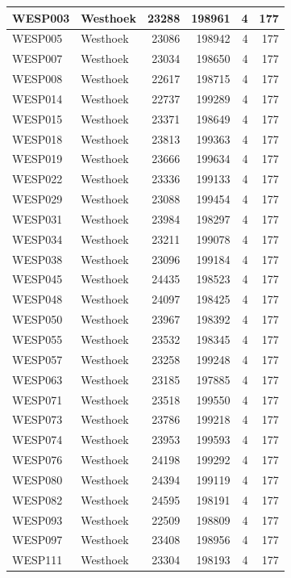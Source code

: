 \documentclass[11pt,]{book}
\begin{document}
\begin{table}
\begin{tabular}[t]{l|l|r|r|r|r}
\hline
WESP003 & Westhoek & 23288 & 198961 & 4 & 177\\
\hline
WESP005 & Westhoek & 23086 & 198942 & 4 & 177\\
\hline
WESP007 & Westhoek & 23034 & 198650 & 4 & 177\\
\hline
WESP008 & Westhoek & 22617 & 198715 & 4 & 177\\
\hline
WESP014 & Westhoek & 22737 & 199289 & 4 & 177\\
\hline
WESP015 & Westhoek & 23371 & 198649 & 4 & 177\\
\hline
WESP018 & Westhoek & 23813 & 199363 & 4 & 177\\
\hline
WESP019 & Westhoek & 23666 & 199634 & 4 & 177\\
\hline
WESP022 & Westhoek & 23336 & 199133 & 4 & 177\\
\hline
WESP029 & Westhoek & 23088 & 199454 & 4 & 177\\
\hline
WESP031 & Westhoek & 23984 & 198297 & 4 & 177\\
\hline
WESP034 & Westhoek & 23211 & 199078 & 4 & 177\\
\hline
WESP038 & Westhoek & 23096 & 199184 & 4 & 177\\
\hline
WESP045 & Westhoek & 24435 & 198523 & 4 & 177\\
\hline
WESP048 & Westhoek & 24097 & 198425 & 4 & 177\\
\hline
WESP050 & Westhoek & 23967 & 198392 & 4 & 177\\
\hline
WESP055 & Westhoek & 23532 & 198345 & 4 & 177\\
\hline
WESP057 & Westhoek & 23258 & 199248 & 4 & 177\\
\hline
WESP063 & Westhoek & 23185 & 197885 & 4 & 177\\
\hline
WESP071 & Westhoek & 23518 & 199550 & 4 & 177\\
\hline
WESP073 & Westhoek & 23786 & 199218 & 4 & 177\\
\hline
WESP074 & Westhoek & 23953 & 199593 & 4 & 177\\
\hline
WESP076 & Westhoek & 24198 & 199292 & 4 & 177\\
\hline
WESP080 & Westhoek & 24394 & 199119 & 4 & 177\\
\hline
WESP082 & Westhoek & 24595 & 198191 & 4 & 177\\
\hline
WESP093 & Westhoek & 22509 & 198809 & 4 & 177\\
\hline
WESP097 & Westhoek & 23408 & 198956 & 4 & 177\\
\hline
WESP111 & Westhoek & 23304 & 198193 & 4 & 177\\

\end{tabular}
\end{table}
\end{document}
